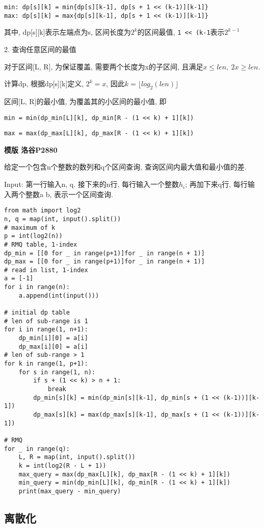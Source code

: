 \documentclass[../main]{subfiles}
\begin{document}
\begin{sloppy}
\begin{verbatim}
min: dp[s][k] = min{dp[s][k-1], dp[s + 1 << (k-1)][k-1]}
max: dp[s][k] = max{dp[s][k-1], dp[s + 1 << (k-1)][k-1]}
\end{verbatim}

其中, dp[s][k]表示左端点为s, 区间长度为$2^k$的区间最值, \verb|1 << (k-1|表示$2^{k-1}$

2. 查询任意区间的最值

对于区间[L, R], 为保证覆盖, 需要两个长度为x的子区间, 且满足$x \leq len,\ 2x \geq len$. 

计算dp, 根据dp[s][k]定义, $2^k = x$, 因此$k = \lfloor log_2(len) \rfloor$

区间[L, R]的最小值, 为覆盖其的小区间的最小值, 即

\verb|min = min(dp_min[L][k], dp_min[R - (1 << k) + 1][k])|

\verb|max = max(dp_max[L][k], dp_max[R - (1 << k) + 1][k])|


\textbf{模版 洛谷P2880}

给定一个包含n个整数的数列和q个区间查询, 查询区间内最大值和最小值的差.

Input: 第一行输入n, q. 接下来的n行, 每行输入一个整数$h_i$; 再加下来q行, 每行输入两个整数a b, 表示一个区间查询.

\begin{lstlisting}[style = Python]
from math import log2
n, q = map(int, input().split())
# maximum of k
p = int(log2(n))
# RMQ table, 1-index
dp_min = [[0 for _ in range(p+1)]for _ in range(n + 1)]
dp_max = [[0 for _ in range(p+1)]for _ in range(n + 1)]
# read in list, 1-index
a = [-1]
for i in range(n):
    a.append(int(input()))

# initial dp table
# len of sub-range is 1
for i in range(1, n+1):
    dp_min[i][0] = a[i]
    dp_max[i][0] = a[i]
# len of sub-range > 1
for k in range(1, p+1):
    for s in range(1, n):
        if s + (1 << k) > n + 1:
            break
        dp_min[s][k] = min(dp_min[s][k-1], dp_min[s + (1 << (k-1))][k-1])
        dp_max[s][k] = max(dp_max[s][k-1], dp_max[s + (1 << (k-1))][k-1])

# RMQ
for _ in range(q):
    L, R = map(int, input().split())
    k = int(log2(R - L + 1))
    max_query = max(dp_max[L][k], dp_max[R - (1 << k) + 1][k])
    min_query = min(dp_min[L][k], dp_min[R - (1 << k) + 1][k])
    print(max_query - min_query)    
\end{lstlisting}

\newpage
\subsection{离散化}


\end{sloppy}
\end{document}
